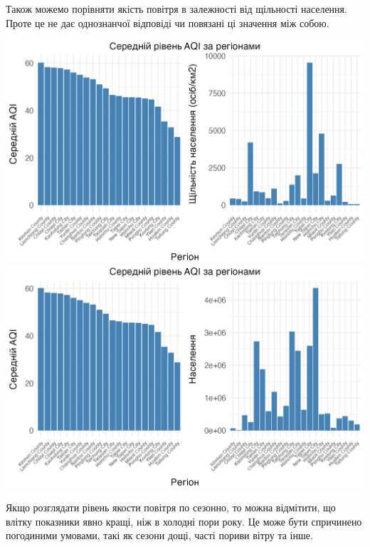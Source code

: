 \documentclass{article}
\begin{document}
\begin{enumerate}
    Також можемо порівняти якість повітря в залежності від щільності населення. Проте це не дає однознанчої відповіді чи повязані ці значення між собою.
    \begin{center}
    \includegraphics[width=6in]{question4/avg_aqi_by_county_w_dens.png}
    \includegraphics[width=6in]{question4/avg_aqi_by_county_w_pop.png}
    \end{center}

    Якщо розглядати рівень якости повітря по сезонно, то можна відмітити, що влітку показники явно кращі, ніж в холодні пори року. Це може бути спричинено погодиними умовами, такі як сезони дощі, часті пориви вітру та інше.
    

\end{enumerate}
\end{document}
